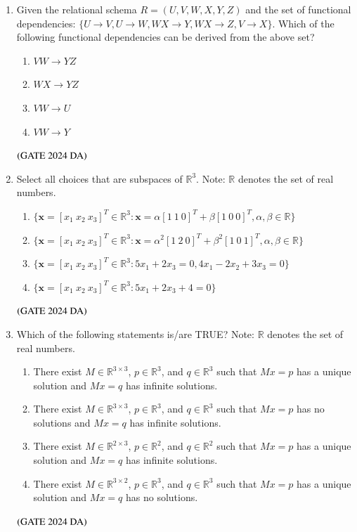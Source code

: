 \documentclass[journal,12pt,onecolumn]{IEEEtran}
\theoremstyle{remark}
\begin{document}
\begin{enumerate}[resume]
\item Given the relational schema $R = (U,V, W, X, Y, Z)$ and the set of functional dependencies: $\{U \to V, U \to W, WX \to Y, WX \to Z, V \to X\}$. Which of the following functional dependencies can be derived from the above set?
\begin{multicols}{4}
\begin{enumerate}
\item $VW \to YZ$
\item $WX \to YZ$
\item $VW \to U$
\item $VW \to Y$
\end{enumerate}
\end{multicols}
\hfill $\left(\text{GATE 2024 DA}\right)$


\item Select all choices that are subspaces of $\mathbb{R}^3$. Note: $\mathbb{R}$ denotes the set of real numbers.
\begin{enumerate}
\item $\{\mathbf{x} = [x_1 \ x_2 \ x_3]^T \in \mathbb{R}^3: \mathbf{x} = \alpha [1 \ 1 \ 0]^T + \beta [1 \ 0 \ 0]^T, \alpha, \beta \in \mathbb{R}\}$
\item $\{\mathbf{x} = [x_1 \ x_2 \ x_3]^T \in \mathbb{R}^3: \mathbf{x} = \alpha^2 [1 \ 2 \ 0]^T + \beta^2 [1 \ 0 \ 1]^T, \alpha, \beta \in \mathbb{R}\}$
\item $\{\mathbf{x} = [x_1 \ x_2 \ x_3]^T \in \mathbb{R}^3: 5x_1 + 2x_3 = 0, 4x_1 - 2x_2 + 3x_3 = 0\}$
\item $\{\mathbf{x} = [x_1 \ x_2 \ x_3]^T \in \mathbb{R}^3: 5x_1 + 2x_3 + 4 = 0\}$
\end{enumerate}
\hfill $\left(\text{GATE 2024 DA}\right)$


\item Which of the following statements is/are TRUE? Note: $\mathbb{R}$ denotes the set of real numbers.
\begin{enumerate}
\item There exist $M \in \mathbb{R}^{3 \times 3}$, $p \in \mathbb{R}^3$, and $q \in \mathbb{R}^3$ such that $Mx = p$ has a unique solution and $Mx = q$ has infinite solutions.
\item There exist $M \in \mathbb{R}^{3 \times 3}$, $p \in \mathbb{R}^3$, and $q \in \mathbb{R}^3$ such that $Mx = p$ has no solutions and $Mx = q$ has infinite solutions.
\item There exist $M \in \mathbb{R}^{2 \times 3}$, $p \in \mathbb{R}^2$, and $q \in \mathbb{R}^2$ such that $Mx = p$ has a unique solution and $Mx = q$ has infinite solutions.
\item There exist $M \in \mathbb{R}^{3 \times 2}$, $p \in \mathbb{R}^3$, and $q \in \mathbb{R}^3$ such that $Mx = p$ has a unique solution and $Mx = q$ has no solutions.
\end{enumerate}
\hfill $\left(\text{GATE 2024 DA}\right)$



\end{enumerate}
\end{document}
